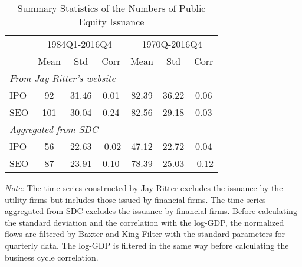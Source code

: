 \documentclass[11pt]{article}
\begin{document}
\begin{table}[htbp]
	{\centering
	\caption{Summary Statistics of the Numbers of Public Equity Issuance}
	\begin{tabular}{lcccccc}
		\toprule[1.5pt]
		& \multicolumn{3}{c}{1984Q1-2016Q4} & \multicolumn{3}{c}{1970Q-2016Q4} \\
		& Mean  & Std   & Corr  & Mean  & Std   & Corr \\
		\midrule
		\multicolumn{7}{l}{\textit{From Jay Ritter's website}} \\
		IPO   & 92    & 31.46 & 0.01  & 82.39 & 36.22 & 0.06 \\
		SEO   & 101   & 30.04 & 0.24  & 82.56 & 29.18 & 0.03 \\
		\multicolumn{7}{l}{\textit{Aggregated from SDC}} \\
		IPO   & 56    & 22.63 & -0.02 & 47.12 & 22.72 & 0.04 \\
		SEO   & 87    & 23.91 & 0.10  & 78.39 & 25.03 & -0.12 \\
		\bottomrule[1.5pt]
	\end{tabular}%
	}
	\flushleft
	\textit{Note:} {\footnotesize The time-series constructed by Jay Ritter excludes the issuance by the utility firms but includes those issued by financial firms. The time-series aggregated from SDC excludes the issuance by financial firms. Before calculating the standard deviation and the correlation with the log-GDP, the normalized flows are filtered by Baxter and King Filter with the standard parameters for quarterly data. The log-GDP is filtered in the same way before calculating the business cycle correlation.}
\end{table}%
\end{document}
